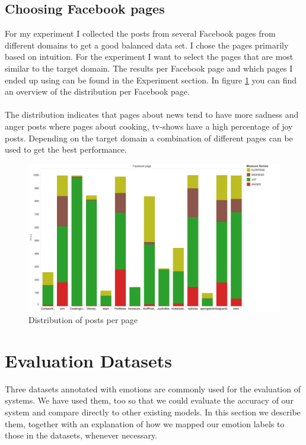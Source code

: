 \documentclass[11pt]{article}
\begin{document}
\subsection{Choosing Facebook pages}
For my experiment I collected the posts from several Facebook pages from different domains to get a good balanced data set. I chose the pages primarily based on intuition. For the experiment I want to select the pages that are most similar to the target domain. The results per Facebook page and which pages I ended up using can be found in the Experiment section. In figure \ref{fig:distribution_facebook} you can find an overview of the distribution per Facebook page. \\\\
The distribution indicates that pages about news tend to have more sadness and anger posts where pages about cooking, tv-shows have a high percentage of joy posts. Depending on the target domain a combination of different pages can be used to get the best performance.
\begin{figure}
    \includegraphics[width=\textwidth,height=\textheight,keepaspectratio]{distribution_facebook.png}  
\caption{Distribution of posts per page}
\label{fig:distribution_facebook}
\end{figure}



\section{Evaluation Datasets}
Three datasets annotated with emotions are commonly used for the evaluation of systems. We have used them, too so that we could evaluate the accuracy of our system and compare directly to other existing models. In this section we describe them, together with an explanation of how we mapped our emotion labels to those in the datasets, whenever necessary.
\end{document}
